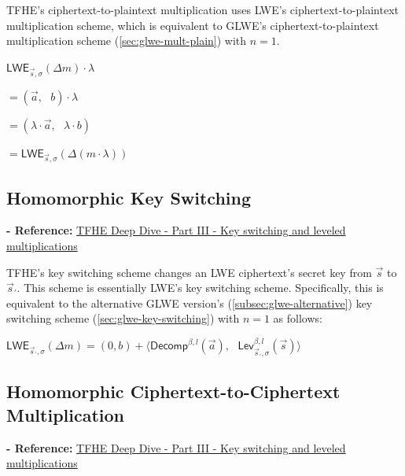 TFHE's ciphertext-to-plaintext multiplication uses LWE's ciphertext-to-plaintext multiplication scheme, which is equivalent to GLWE's ciphertext-to-plaintext multiplication scheme (\autoref{sec:glwe-mult-plain}) with $n = 1$.  

\begin{tcolorbox}[title={\textbf{\tboxlabel{\ref*{subsec:tfhe-mult-plain}} TFHE Ciphertext-to-Plaintext Multiplication}}]
$\textsf{LWE}_{\vec{s}, \sigma}(\Delta m) \cdot \lambda$

$= (\vec{a}, \text{ } b) \cdot \lambda$

$= (\lambda\cdot \vec{a}, \text{ } \lambda \cdot b)$

$= \textsf{LWE}_{\vec{s}, \sigma}(\Delta (m \cdot \lambda) )$
\end{tcolorbox}


\subsection{Homomorphic Key Switching}
\label{subsec:tfhe-key-switching}

\textbf{- Reference:} 
\href{https://www.zama.ai/post/tfhe-deep-dive-part-3}{TFHE Deep Dive - Part III - Key switching and leveled multiplications}~\cite{tfhe-3}

TFHE's key switching scheme changes an LWE ciphertext's secret key from $\vec{s}$ to $\vec{s}_{'}$. This scheme is essentially LWE's key switching scheme. Specifically, this is equivalent to the alternative GLWE version's (\autoref{subsec:glwe-alternative}) key switching scheme (\autoref{sec:glwe-key-switching}) with $n = 1$ as follows:

\begin{tcolorbox}[title={\textbf{\tboxlabel{\ref*{subsec:tfhe-key-switching}} TFHE Key Switching}}]
$\textsf{LWE}_{\vec{s}_{'},\sigma}(\Delta m) = (0, b) + \bm{\langle} \textsf{Decomp}^{\beta, l}(\vec{a}), \text{ } \textsf{Lev}_{\vec{s}_{'}, \sigma}^{\beta, l}(\vec{s}) \bm{\rangle}$
\end{tcolorbox}


\subsection{Homomorphic Ciphertext-to-Ciphertext Multiplication}
\label{subsec:tfhe-mult-cipher}

\textbf{- Reference:} 
\href{https://www.zama.ai/post/tfhe-deep-dive-part-3}{TFHE Deep Dive - Part III - Key switching and leveled multiplications}~\cite{tfhe-3}

